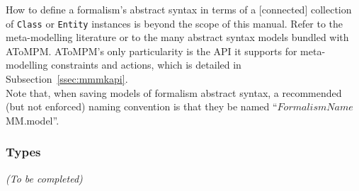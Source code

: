\documentclass{article}
\numberwithin{equation}{section}
\numberwithin{figure}{section}
\newcommand{\TBC}{\textit{(To be completed) }}
\begin{document}
How to define a formalism's abstract syntax in terms of a [connected] collection of \texttt{Class} or \texttt{Entity} instances is beyond the scope of this manual. Refer to the meta-modelling literature or to the many abstract syntax models bundled with AToMPM. AToMPM's only particularity is the API it supports for meta-modelling constraints and actions, which is detailed in Subsection~\ref{ssec:mmmkapi}.\\

Note that, when saving models of formalism abstract syntax, a recommended (but not enforced) naming convention is that they be named ``$FormalismName$MM.model''.


\subsubsection{Types}
\TBC



\end{document}
